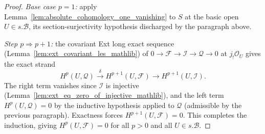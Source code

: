 \begin{proof}
  \emph{Base case \(p = 1\):} apply Lemma~\ref{lem:absolute_cohomology_one_vanishing} to \(S\) at
  the basic open \(U \in s.\mathcal{B}\), its section-surjectivity hypothesis discharged by the
  paragraph above.

  \emph{Step \(p \Rightarrow p+1\):} the covariant Ext long exact sequence
  (Lemma~\ref{lem:ext_covariant_les_mathlib}) of
  \(0 \to \mathcal{F} \to \mathcal{I} \to \mathcal{Q} \to 0\) at \(j_!\mathcal{O}_U\)
  gives the exact strand
  \[
    H^p(U, \mathcal{Q}) \xrightarrow{\ \delta\ } H^{p+1}(U, \mathcal{F}) \to
      H^{p+1}(U, \mathcal{I}).
  \]
  The right term vanishes since \(\mathcal{I}\) is injective
  (Lemma~\ref{lem:ext_eq_zero_of_injective_mathlib}), and the left term
  \(H^p(U, \mathcal{Q}) = 0\) by the inductive hypothesis applied to \(\mathcal{Q}\)
  (admissible by the previous paragraph). Exactness forces
  \(H^{p+1}(U, \mathcal{F}) = 0\). This completes the induction, giving
  \(H^p(U, \mathcal{F}) = 0\) for all \(p > 0\) and all \(U \in s.\mathcal{B}\).
\end{proof}

